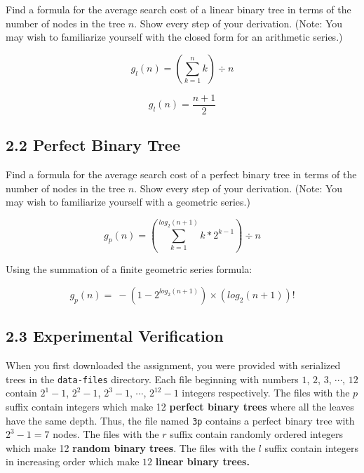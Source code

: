 \documentclass{article}
\begin{document}
Find a formula for the average search cost of a linear binary tree in terms of the number of nodes in the tree $n$. Show every step of your derivation. (Note: You may wish to familiarize yourself with the closed form for an arithmetic series.)

\begin{equation}
    g_l(n) = (\sum_{k=1}^{n} k) \div n
\end{equation}

\begin{equation}
    g_l(n) = \frac{n + 1}{2}
\end{equation}

\subsection*{2.2 Perfect Binary Tree}

Find a formula for the average search cost of a perfect binary tree in terms of the number of nodes in the tree $n$. Show every step of your derivation. (Note: You may wish to familiarize yourself with a geometric series.)

\begin{equation}
    g_p(n) = (\sum_{k=1}^{log_{2}(n + 1)} k * 2^{k - 1}) \div n
\end{equation}

Using the summation of a finite geometric series formula:

\begin{equation}
    g_p(n) = \ -(1 - 2^{log_{2}(n + 1)}) \times (log_{2}(n + 1))!
\end{equation}

\subsection*{2.3 Experimental Verification}

When you first downloaded the assignment, you were provided with serialized trees in the \verb|data-files| directory. Each file beginning with numbers $1$, $2$, $3$, $\cdots$, $12$ contain $2^1 - 1$, $2^2 -1$, $2^3 - 1$, $\cdots$, $2^{12} - 1$ integers respectively. The files with the $p$ suffix contain integers which make 12 \textbf{perfect binary trees} where all the leaves have the same depth. Thus, the file named \verb|3p| contains a perfect binary tree with $2^{3} - 1 = 7$ nodes. The files with the $r$ suffix contain randomly ordered integers which make 12 \textbf{random binary trees}. The files with the $l$ suffix contain integers in increasing order which make $12$ \textbf{linear binary trees.} 
\end{document}
